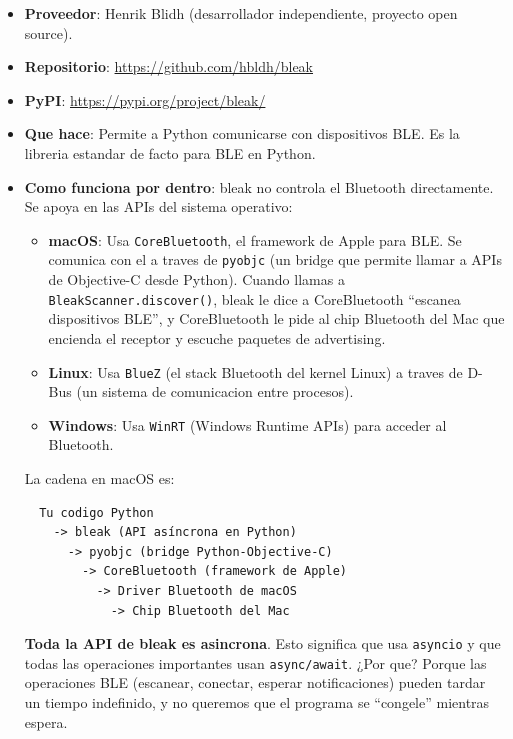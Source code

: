 \documentclass[11pt,a4paper]{article}
\begin{document}
\begin{itemize}
    \item \textbf{Proveedor}: Henrik Blidh (desarrollador
          independiente, proyecto open source).
    \item \textbf{Repositorio}: \url{https://github.com/hbldh/bleak}
    \item \textbf{PyPI}: \url{https://pypi.org/project/bleak/}
    \item \textbf{Que hace}: Permite a Python comunicarse con
          dispositivos BLE. Es la libreria estandar de facto para
          BLE en Python.
    \item \textbf{Como funciona por dentro}: bleak no controla el
          Bluetooth directamente. Se apoya en las APIs del sistema
          operativo:

    \begin{itemize}
        \item \textbf{macOS}: Usa \texttt{CoreBluetooth}, el framework
              de Apple para BLE. Se comunica con el a traves de
              \texttt{pyobjc} (un bridge que permite llamar a APIs
              de Objective-C desde Python). Cuando llamas a
              \texttt{BleakScanner.discover()}, bleak le dice a
              CoreBluetooth ``escanea dispositivos BLE'', y
              CoreBluetooth le pide al chip Bluetooth del Mac que
              encienda el receptor y escuche paquetes de advertising.

        \item \textbf{Linux}: Usa \texttt{BlueZ} (el stack Bluetooth
              del kernel Linux) a traves de D-Bus (un sistema de
              comunicacion entre procesos).

        \item \textbf{Windows}: Usa \texttt{WinRT} (Windows Runtime
              APIs) para acceder al Bluetooth.
    \end{itemize}

    La cadena en macOS es:

\begin{verbatim}
  Tu codigo Python
    -> bleak (API asíncrona en Python)
      -> pyobjc (bridge Python-Objective-C)
        -> CoreBluetooth (framework de Apple)
          -> Driver Bluetooth de macOS
            -> Chip Bluetooth del Mac
\end{verbatim}

    \textbf{Toda la API de bleak es asincrona}. Esto significa que
    usa \texttt{asyncio} y que todas las operaciones importantes
    usan \texttt{async/await}. ¿Por que? Porque las operaciones BLE
    (escanear, conectar, esperar notificaciones) pueden tardar un
    tiempo indefinido, y no queremos que el programa se ``congele''
    mientras espera.
\end{itemize}
\end{document}
